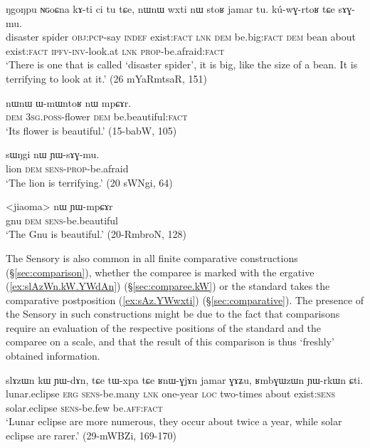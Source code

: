  \begin{exe}
\ex \label{ex:sAGmu}
\gll  ŋgoŋpu ɴɢoɕna kɤ-ti ci tu tɕe, nɯnɯ wxti nɯ stoʁ jamar tu. kú-wɣ-rtoʁ tɕe sɤɣ-mu. \\
disaster spider \textsc{obj}:\textsc{pcp}-say \textsc{indef} exist:\textsc{fact} \textsc{lnk} \textsc{dem} be.big:\textsc{fact}  \textsc{dem} bean about exist:\textsc{fact} \textsc{ipfv}-\textsc{inv}-look.at \textsc{lnk} \textsc{prop}-be.afraid:\textsc{fact} \\
\glt `There is one that is  called `disaster spider', it is big, like the size of a bean. It is terrifying to look at it.' (26 mYaRmtsaR, 151)
\end{exe}


\begin{exe}
\ex \label{ex:mpCAr}
\gll nɯnɯ ɯ-mɯntoʁ nɯ mpɕɤr. \\
\textsc{dem} \textsc{3sg}.\textsc{poss}-flower \textsc{dem} be.beautiful:\textsc{fact} \\
\glt `Its flower is beautiful.' (15-babW, 105)
\end{exe}

\begin{exe}
	\ex \label{ex:YWsAGmu}
	\gll  sɯŋgi nɯ ɲɯ-sɤɣ-mu. \\
	lion \textsc{dem} \textsc{sens}-\textsc{prop}-be.afraid \\
	\glt `The lion is terrifying.' (20 sWNgi, 64)
\end{exe}

\begin{exe}
\ex \label{ex:YWmpCAr}
\gll <jiaoma> nɯ ɲɯ-mpɕɤr \\
gnu \textsc{dem} \textsc{sens}-be.beautiful \\
\glt `The Gnu is beautiful.' (20-RmbroN, 128)
\end{exe}

The Sensory is also common in all finite comparative constructions (§\ref{sec:comparison}), whether the comparee is marked with the ergative (\ref{ex:slAzWn.kW.YWdAn}) (§\ref{sec:comparee.kW}) or the standard takes the comparative postposition (\ref{ex:sAz.YWwxti}) (§\ref{sec:comparative}). The presence of the Sensory in such constructions might be due to the fact that comparisons require an evaluation of the respective positions of the standard and the comparee on a scale, and that the result of this comparison is thus `freshly' obtained information.

\begin{exe}
\ex \label{ex:slAzWn.kW.YWdAn}
\gll slɤzɯn kɯ ɲɯ-dɤn, tɕe tɯ-xpa tɕe ʁnɯ-ɣjɤn jamar ɣɤʑu, ʁmbɣɯzɯn ɲɯ-rkɯn ɕti. \\
lunar.eclipse \textsc{erg} \textsc{sens}-be.many \textsc{lnk} one-year \textsc{loc} two-times about exist:\textsc{sens} solar.eclipse \textsc{sens}-be.few be.\textsc{aff}:\textsc{fact} \\
\glt `Lunar eclipse are more numerous, they occur about twice a year, while solar eclipse are rarer.' (29-mWBZi, 169-170)
\end{exe}

